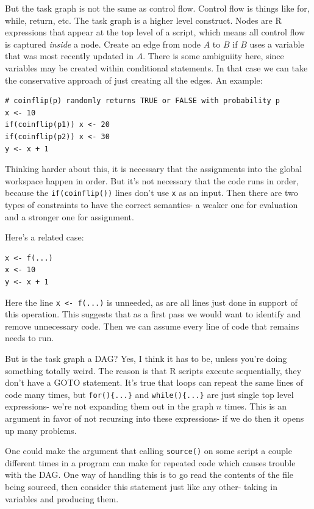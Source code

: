 \documentclass[12pt]{article}
\begin{document}
But the task graph is not the same as control flow. Control flow is things
like for, while, return, etc. The task graph is a higher level construct. 
Nodes are R expressions that appear at the top level of a script, which
means all control flow is captured \emph{inside} a node. Create an edge
from node $A$ to $B$ if $B$ uses a variable that was most recently updated
in $A$. There is some ambiguiity here, since variables may be created
within conditional statements. In that case we can take the conservative
approach of just creating all the edges. An example:

\begin{verbatim}
# coinflip(p) randomly returns TRUE or FALSE with probability p
x <- 10
if(coinflip(p1)) x <- 20
if(coinflip(p2)) x <- 30
y <- x + 1
\end{verbatim}

Thinking harder about this, it is necessary that the assignments into the
global workspace happen in order. But it's not necessary that the code runs
in order, because the \texttt{if(coinflip())} lines don't use \texttt{x} as
an input. Then there are two types of constraints to have the correct
semantics- a weaker one for evaluation and a stronger one for assignment. 

Here's a related case:

\begin{verbatim}
x <- f(...)
x <- 10
y <- x + 1
\end{verbatim}

Here the line \texttt{x <- f(...)} is unneeded, as are all lines just done
in support of this operation. This suggests that as a first pass we would
want to identify and remove unnecessary code. Then we can assume every
line of code that remains needs to run.

But is the task graph a DAG? Yes, I think it has to be, unless you're doing
something totally weird.  The reason is that R scripts execute
sequentially, they don't have a GOTO statement. It's true that loops can
repeat the same lines of code many times, but \texttt{for()\{...\}} and 
\texttt{while()\{...\}} are just single top level expressions- we're not
expanding them out in the graph $n$ times. This is an argument in favor of
not recursing into these expressions- if we do then it opens up many
problems. 

One could make the argument that calling \texttt{source()} on some script
a couple different times in a program can make for repeated code which
causes trouble with the DAG. One way of handling this is to go read the
contents of the file being sourced, then consider this statement just like
any other- taking in variables and producing them.
\end{document}
